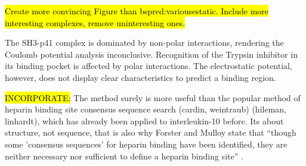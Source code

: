 \hl{Create more convincing Figure than bspred:variousestatic.
Include more interesting complexes, remove uninteresting ones.}

The SH3-p41 complex is dominated by non-polar interactions, rendering the
Coulomb potential analysis inconclusive. Recognition of the Trypsin inhibitor in
its  binding pocket is affected by polar interactions. The electrostatic
potential, however, does not display clear characteristics to predict a binding
region.



\hl{INCORPORATE:} The method surely is more useful than the popular method of
heparin binding site consensus sequence search (cardin, weintraub) (hileman,
linhardt), which has already been applied to interleukin-10 before. Its about
structure, not sequence, that is also why Forster and Mulloy state that
\enquote{though some 'consensus sequences' for heparin binding have been
identified, they are neither necessary nor sufficient to define a heparin
binding site} \cite{forster_computational_2006}.
